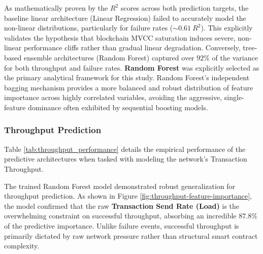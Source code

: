 \documentclass[12pt]{article}
\begin{document}
As mathematically proven by the $R^2$ scores across both prediction targets, the baseline linear architecture (Linear Regression) failed to accurately model the non-linear distributions, particularly for failure rates ($\sim0.61~R^2$). This explicitly validates the hypothesis that blockchain MVCC saturation induces severe, non-linear performance cliffs rather than gradual linear degradation. Conversely, tree-based ensemble architectures (Random Forest) captured over $92\%$ of the variance for both throughput and failure rates. \textbf{Random Forest} was explicitly selected as the primary analytical framework for this study. Random Forest's independent bagging mechanism provides a more balanced and robust distribution of feature importance across highly correlated variables, avoiding the aggressive, single-feature dominance often exhibited by sequential boosting models.

\subsubsection{Throughput Prediction}
Table \ref{tab:throughput_performance} details the empirical performance of the predictive architectures when tasked with modeling the network's Transaction Throughput.

\begin{table}[ht]
\centering
\caption{Comparative Predictive Performance (Target: Transaction Throughput)}
\label{tab:throughput_performance}
\end{table}

The trained Random Forest model demonstrated robust generalization for throughput prediction. As shown in Figure \ref{fig:throughput-feature-importance}, the model confirmed that the raw \textbf{Transaction Send Rate (Load)} is the overwhelming constraint on successful throughput, absorbing an incredible $87.8\%$ of the predictive importance. Unlike failure events, successful throughput is primarily dictated by raw network pressure rather than structural smart contract complexity.
\end{document}
